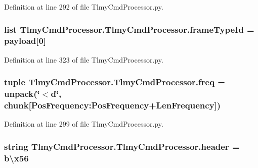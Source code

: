 Definition at line 292 of file Tlmy\+Cmd\+Processor.\+py.

\hypertarget{namespace_tlmy_cmd_processor_1_1_tlmy_cmd_processor_a128712f61580e83610264ccc8c908888}{}
\subsubsection[{frame\+Type\+Id}]{\setlength{\rightskip}{0pt plus 5cm}list Tlmy\+Cmd\+Processor.\+Tlmy\+Cmd\+Processor.\+frame\+Type\+Id = {\bf payload}\mbox{[}0\mbox{]}}\label{namespace_tlmy_cmd_processor_1_1_tlmy_cmd_processor_a128712f61580e83610264ccc8c908888}


Definition at line 323 of file Tlmy\+Cmd\+Processor.\+py.

\hypertarget{namespace_tlmy_cmd_processor_1_1_tlmy_cmd_processor_ac9f1fd4fc03735dd9b81e06ee6573218}{}
\subsubsection[{freq}]{\setlength{\rightskip}{0pt plus 5cm}tuple Tlmy\+Cmd\+Processor.\+Tlmy\+Cmd\+Processor.\+freq = unpack(\char`\"{}$<$d\char`\"{}, chunk\mbox{[}Pos\+Frequency\+:\+Pos\+Frequency+{\bf Len\+Frequency}\mbox{]})}\label{namespace_tlmy_cmd_processor_1_1_tlmy_cmd_processor_ac9f1fd4fc03735dd9b81e06ee6573218}


Definition at line 299 of file Tlmy\+Cmd\+Processor.\+py.

\hypertarget{namespace_tlmy_cmd_processor_1_1_tlmy_cmd_processor_aa59c73aaa44ae3a6862aa0c8678ae47b}{}
\subsubsection[{header}]{\setlength{\rightskip}{0pt plus 5cm}string Tlmy\+Cmd\+Processor.\+Tlmy\+Cmd\+Processor.\+header = {\bf b}\textquotesingle{}\textbackslash{}x56\textquotesingle{}}\label{namespace_tlmy_cmd_processor_1_1_tlmy_cmd_processor_aa59c73aaa44ae3a6862aa0c8678ae47b}


